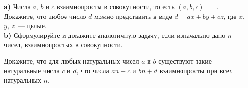 \begin{problems}
\item \textbf{a)} Числа $a$, $b$ и $c$ взаимнопросты в совокупности, то есть $(a,b,c)=1$.\\
Докажите, что любое число $d$ можно представить в виде $d=ax+by+cz$, где $x$, $y$, $z$~--- целые.\\
\textbf{b)} Сформулируйте и докажите аналогичную задачу, если изначально дано $n$ чисел, взаимнопростых в совокупности.

\item Докажите, что для любых натуральных чисел $a$ и $b$ существуют такие натуральные числа $c$ и $d$, что числа $an+c$ и $bn+d$ взаимнопросты при всех натуральных $n$.


\end{problems}
